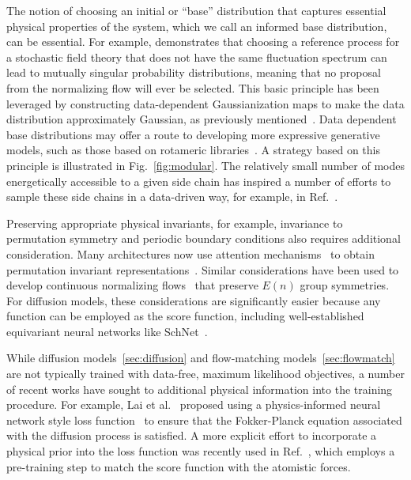 \documentclass[11pt]{article}
\begin{document}
The notion of choosing an initial or ``base'' distribution that captures essential physical properties of the system, which we call an informed base distribution, can be essential. 
For example, \cite{gabrie_adaptive_2022} demonstrates that choosing a reference process for a stochastic field theory that does not have the same fluctuation spectrum can lead to mutually singular probability distributions, meaning that no proposal from the normalizing flow will ever be selected.
This basic principle has been leveraged by constructing data-dependent Gaussianization maps to make the data distribution approximately Gaussian, as previously mentioned~\cite{noe_boltzmann_2019}.
Data dependent base distributions may offer a route to developing more expressive generative models, such as those based on rotameric libraries~\cite{dunbrack_jr_bayesian_1997, dunbrack_rotamer_2002}.
A strategy based on this principle is illustrated in Fig.~\ref{fig:modular}.
The relatively small number of modes energetically accessible to a given side chain has inspired a number of efforts to sample these side chains in a data-driven way, for example, in Ref.~\cite{jumper_rapid_2017}.

Preserving appropriate physical invariants, for example, invariance to permutation symmetry and periodic boundary conditions also requires additional consideration.
Many architectures now use attention mechanisms~\cite{vaswani_attention_2017} to obtain permutation invariant representations~\cite{wirnsberger_targeted_2020}.
Similar considerations have been used to develop continuous normalizing flows~\cite{satorras_en_2021-1} that preserve $E(n)$ group symmetries. 
For diffusion models, these considerations are significantly easier because any function can be employed as the score function, including well-established equivariant neural networks like SchNet~\cite{schutt_schnet_2018}. 

While diffusion models~\ref{sec:diffusion} and flow-matching models~\ref{sec:flowmatch} are not typically trained with data-free, maximum likelihood objectives, a number of recent works have sought to additional physical information into the training procedure.
For example, Lai et al.~\cite{lai_fp-diffusion_2023} proposed using a physics-informed neural network style loss function~\cite{karniadakis_physics-informed_2021} to ensure that the Fokker-Planck equation associated with the diffusion process is satisfied.
A more explicit effort to incorporate a physical prior into the loss function was recently used in Ref.~\cite{zheng_towards_2023}, which employs a pre-training step to match the score function with the atomistic forces.
\end{document}
